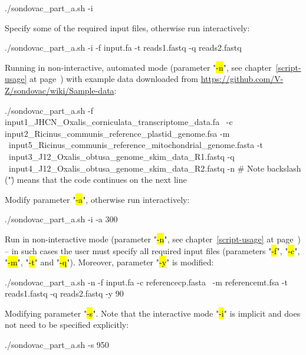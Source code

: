 \documentclass[a4paper, 11pt, twoside]{article}
\renewcommand{\texttt}[1]{\hl{\ttfamily #1}}
\begin{document}
\begin{bashcode}
  ./sondovac_part_a.sh -i
\end{bashcode}

Specify some of the required input files, otherwise run interactively:

\begin{bashcode}
  ./sondovac_part_a.sh -i -f input.fa -t reads1.fastq -q reads2.fastq
\end{bashcode}

Running in non-interactive, automated mode (parameter "\texttt{-n}", see chapter~\ref{script-usage} at page~\pageref{script-usage}) with 
example data downloaded from \url{https://github.com/V-Z/sondovac/wiki/Sample-data}:

\begin{bashcode}
  ./sondovac_part_a.sh -f input1_JHCN_Oxalis_corniculata_transcriptome_data.fa \
    -c input2_Ricinus_communis_reference_plastid_genome.fsa -m \
    input5_Ricinus_communis_reference_mitochondrial_genome.fasta -t \
    input3_J12_Oxalis_obtusa_genome_skim_data_R1.fastq -q \
    input4_J12_Oxalis_obtusa_genome_skim_data_R2.fastq -n
  # Note backslash ("\") means that the code continues on the next line
\end{bashcode}

Modify parameter "\texttt{-a}", otherwise run interactively:

\begin{bashcode}
  ./sondovac_part_a.sh -i -a 300
\end{bashcode}

Run in non-interactive mode (parameter "\texttt{-n}", see chapter~\ref{script-usage} at page~\pageref{script-usage}) -- in such cases the user must specify all required input files (parameters "\texttt{-f}", "\texttt{-c}", "\texttt{-m}", "\texttt{-t}" and "\texttt{-q}"). Moreover, parameter "\texttt{-y}" is modified:

\begin{bashcode}
  ./sondovac_part_a.sh -n -f input.fa -c referencecp.fasta \
    -m referencemt.fsa -t reads1.fastq -q reads2.fastq -y 90
\end{bashcode}

Modifying parameter "\texttt{-s}". Note that the interactive mode "\texttt{-i}" is implicit and does not need to be specified explicitly:

\begin{bashcode}
  ./sondovac_part_a.sh -s 950
\end{bashcode}
\end{document}
